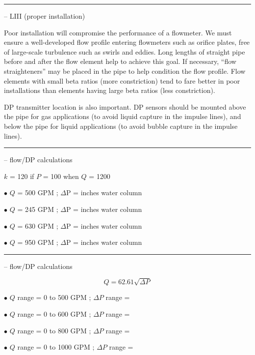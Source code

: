 \filbreak \vskip 5pt \hrule \vskip 5pt  -- LIII (proper installation) \vskip 10pt

Poor installation will compromise the performance of a flowmeter.  We must ensure a well-developed flow profile entering flowmeters such as orifice plates, free of large-scale turbulence such as swirls and eddies.  Long lengths of straight pipe before and after the flow element help to achieve this goal.  If necessary, ``flow straighteners'' may be placed in the pipe to help condition the flow profile.  Flow elements with small beta ratios (more constriction) tend to fare better in poor installations than elements having large beta ratios (less constriction).

\vskip 10pt

DP transmitter location is also important.  DP sensors should be mounted above the pipe for gas applications (to avoid liquid capture in the impulse lines), and below the pipe for liquid applications (to avoid bubble capture in the impulse lines).


\filbreak \vskip 5pt \hrule \vskip 5pt  -- flow/DP calculations \vskip 10pt

$k$ = 120 if $P$ = 100 when $Q$ = 1200

\medskip
\item{$\bullet$} $Q$ = 500 GPM ; $\Delta$P =  inches water column
\item{$\bullet$} $Q$ = 245 GPM ; $\Delta$P =  inches water column
\item{$\bullet$} $Q$ = 630 GPM ; $\Delta$P =  inches water column
\item{$\bullet$} $Q$ = 950 GPM ; $\Delta$P =  inches water column
\medskip


\filbreak \vskip 5pt \hrule \vskip 5pt  -- flow/DP calculations \vskip 10pt

$$Q = 62.61 \sqrt{\Delta P}$$

\medskip
\item{$\bullet$} $Q$ range = 0 to 500 GPM ; $\Delta P$ range = 
\item{$\bullet$} $Q$ range = 0 to 600 GPM ; $\Delta P$ range = 
\item{$\bullet$} $Q$ range = 0 to 800 GPM ; $\Delta P$ range = 
\item{$\bullet$} $Q$ range = 0 to 1000 GPM ; $\Delta P$ range = 
\medskip


